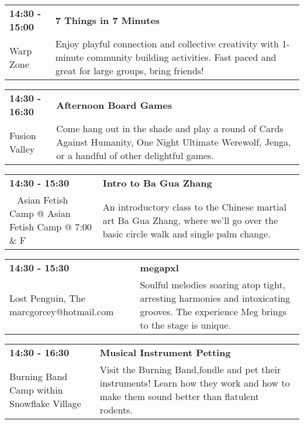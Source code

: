 \begin{tabular}{ p{1in} p{2.2in} }
    \textbf{14:30 - 15:00} & \textbf{7 Things in 7 Minutes} \\
    Warp Zone \newline  & Enjoy playful connection and collective creativity with 1-minute community building activities. Fast paced and great for large groups, bring friends! \\
    \hline 
\end{tabular}
    
\begin{tabular}{ p{1in} p{2.2in} }
    \textbf{14:30 - 16:30} & \textbf{Afternoon Board Games} \\
    Fusion Valley \newline  & Come hang out in the shade and play a round of Cards Against Humanity, One Night Ultimate Werewolf, Jenga, or a handful of other delightful games. \\
    \hline 
\end{tabular}
    
\begin{tabular}{ p{1in} p{2.2in} }
    \textbf{14:30 - 15:30} & \textbf{Intro to Ba Gua Zhang} \\
    ~ \newline Asian Fetish Camp @ Asian Fetish Camp @ 7:00 \& F & An introductory class to the Chinese martial art Ba Gua Zhang, where we'll go over the basic circle walk and single palm change. \\
    \hline 
\end{tabular}
    
\begin{tabular}{ p{1in} p{2.2in} }
    \textbf{14:30 - 15:30} & \textbf{megapxl} \\
    Lost Penguin, The \newline marcgorcey@hotmail.com & Soulful melodies soaring atop tight, arresting harmonies and intoxicating grooves. The experience Meg brings to the stage is unique. \\
    \hline 
\end{tabular}
    
\begin{tabular}{ p{1in} p{2.2in} }
    \textbf{14:30 - 16:30} & \textbf{Musical Instrument Petting} \\
    Burning Band Camp \newline within Snowflake Village & Visit the Burning Band,fondle and pet their instruments! Learn how they work and how to make them sound better than flatulent rodents. \\
    \hline 
\end{tabular}
    
